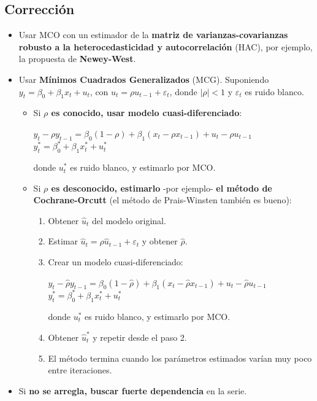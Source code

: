 \documentclass[10pt, a4paper, landscape]{extarticle}
\begin{document}
\begin{multicols}{3}
	\subsection*{Corrección}
		\begin{itemize}[leftmargin=*]
			\item Usar MCO con un estimador de la \textbf{matriz de varianzas-covarianzas} \textbf{robusto a la heterocedasticidad y autocorrelación} (HAC), por ejemplo, la propuesta de \textbf{Newey-West}.
			\item Usar \textbf{Mínimos Cuadrados Generalizados} (MCG). Suponiendo $y_t = \beta_0 + \beta_1 x_t + u_t$, con $u_t = \rho u_{t-1} + \varepsilon_t$, donde $|\rho| < 1$ y $\varepsilon_t$ es ruido blanco.
			\begin{itemize}[leftmargin=*]
				\item Si \textbf{$\rho$ es conocido, usar modelo cuasi-diferenciado}:
				\begin{center}
					$y_t - \rho y_{t-1} = \beta_0 (1 - \rho) + \beta_1 (x_t - \rho x_{t-1}) + u_t - \rho u_{t-1}$
					\ $y_t^* = \beta_0^* + \beta_1 x_t^* + u_t^*$
				\end{center}
				donde $u_t^*$ es ruido blanco, y estimarlo por MCO.
				\item Si \textbf{$\rho$ es desconocido, estimarlo} -por ejemplo- \textbf{el método de Cochrane-Orcutt} (el método de Prais-Winsten también es bueno):
				\begin{enumerate}[leftmargin=*]
					\item Obtener $\hat{u}_t$ del modelo original.
					\item Estimar $\hat{u}_t = \rho \hat{u}_{t-1} + \varepsilon_t$ y obtener $\hat{\rho}$.
					\item Crear un modelo cuasi-diferenciado:
					\begin{center}
						$y_t - \hat{\rho} y_{t-1} = \beta_0 (1 - \hat{\rho}) + \beta_1 (x_t - \hat{\rho} x_{t-1}) + u_t - \hat{\rho} u_{t-1}$
						\ $y_t^* = \beta_0^* + \beta_1 x_t^* + u_t^*$
					\end{center}
					donde $u_t^*$ es ruido blanco, y estimarlo por MCO.
					\item Obtener $\hat{u}_t^*$ y repetir desde el paso 2.
					\item El método termina cuando los parámetros estimados varían muy poco entre iteraciones.
				\end{enumerate}
			\end{itemize}
		\item Si \textbf{no se arregla, buscar fuerte dependencia} en la serie.
		\end{itemize}


\end{multicols}
\end{document}
